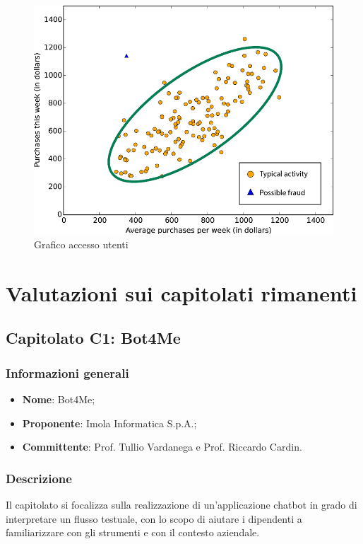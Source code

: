 \documentclass[11pt]{article}
\begin{document}
    \begin{figure}[h!]
        \centering
        \includegraphics[scale=0.4]{Res/LoginWarrior.png}
        \caption{Grafico accesso utenti}
        \label{zucchetti}
    \end{figure}

\newpage


\section{Valutazioni sui capitolati rimanenti}
\subsection{Capitolato C1: Bot4Me}

    \subsubsection{Informazioni generali}
    \begin{itemize}
        \item \textbf{Nome}: Bot4Me;
        \item \textbf{Proponente}: Imola Informatica S.p.A.;
        \item \textbf{Committente}: Prof. Tullio Vardanega e Prof. Riccardo Cardin.
    \end{itemize}
    
    \subsubsection{Descrizione}
    Il capitolato si focalizza sulla realizzazione di un'applicazione chatbot in grado di interpretare un flusso testuale,
    con lo scopo di aiutare i dipendenti a familiarizzare con gli strumenti e con il contesto aziendale.
    
\end{document}
